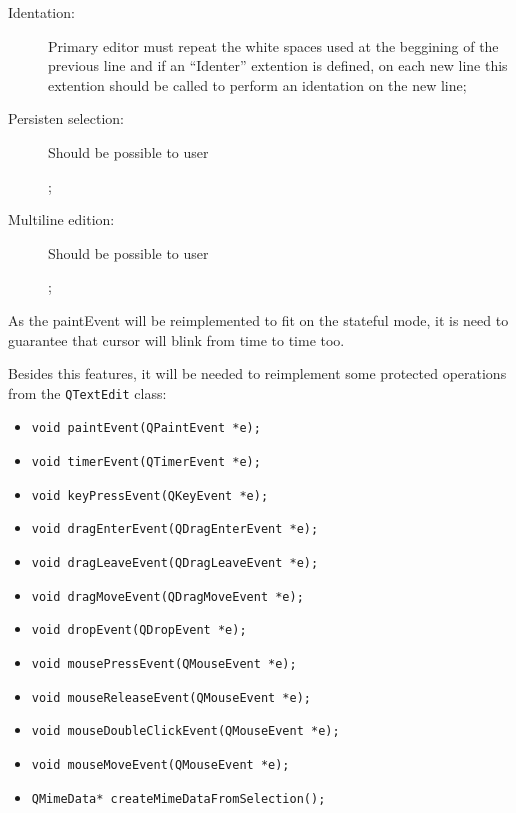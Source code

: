 \documentclass[11pt,a4paper]{report}
\begin{document}
\begin{description}
\item[Identation:] Primary editor must repeat the white spaces used at the beggining of the previous line and if an ``Identer'' extention is defined, on each new line this extention should be called to perform an identation on the new line;

\item[Persisten selection:] Should be possible to user ;

\item[Multiline edition:] Should be possible to user ;

\end{description}

As the paintEvent will be reimplemented to fit on the stateful mode, it is need to guarantee that cursor will blink from time to time too.

Besides this features, it will be needed to reimplement some protected operations from the \texttt{QTextEdit} class:

\begin{itemize}
\item \texttt{void paintEvent(QPaintEvent *e);}
\item \texttt{void timerEvent(QTimerEvent *e);}
\item \texttt{void keyPressEvent(QKeyEvent *e);}
\item \texttt{void dragEnterEvent(QDragEnterEvent *e);}
\item \texttt{void dragLeaveEvent(QDragLeaveEvent *e);}
\item \texttt{void dragMoveEvent(QDragMoveEvent *e);}
\item \texttt{void dropEvent(QDropEvent *e);}
\item \texttt{void mousePressEvent(QMouseEvent *e);}
\item \texttt{void mouseReleaseEvent(QMouseEvent *e);}
\item \texttt{void mouseDoubleClickEvent(QMouseEvent *e);}
\item \texttt{void mouseMoveEvent(QMouseEvent *e);}
\item \texttt{QMimeData* createMimeDataFromSelection();}
\end{itemize}
\end{document}
